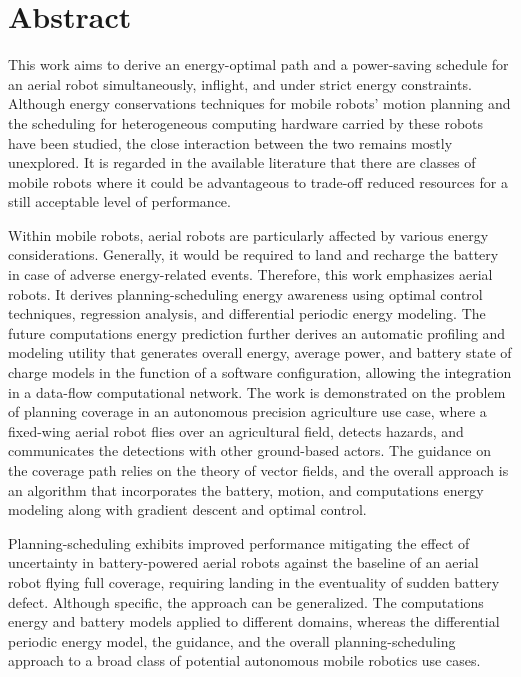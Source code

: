 
%
%
\chapter*{Abstract}

This work aims to derive an energy-optimal path and a power-saving schedule for an aerial robot simultaneously, inflight, and under strict energy constraints. Although energy conservations techniques for mobile robots' motion planning and the scheduling for heterogeneous computing hardware carried by these robots have been studied, the close interaction between the two remains mostly unexplored. It is regarded in the available literature that there are classes of mobile robots where it could be advantageous to trade-off reduced resources for a still acceptable level of performance. 

Within mobile robots, aerial robots are particularly affected by various energy considerations. Generally, it would be required to land and recharge the battery in case of adverse energy-related events. Therefore, this work emphasizes aerial robots. It derives planning-scheduling energy awareness using optimal control techniques, regression analysis, and differential periodic energy modeling. The future computations energy prediction further derives an automatic profiling and modeling utility that generates overall energy, average power, and battery state of charge models in the function of a software configuration, allowing the integration in a data-flow computational network. The work is demonstrated on the problem of planning coverage in an autonomous precision agriculture use case, where a fixed-wing aerial robot flies over an agricultural field, detects hazards, and communicates the detections with other ground-based actors. The guidance on the coverage path relies on the theory of vector fields, and the overall approach is an algorithm that incorporates the battery, motion, and computations energy modeling along with gradient descent and optimal control. 

Planning-scheduling exhibits improved performance mitigating the effect of uncertainty in battery-powered aerial robots against the baseline of an aerial robot flying full coverage, requiring landing in the eventuality of sudden battery defect. Although specific, the approach can be generalized. The computations energy and battery models applied to different domains, whereas the differential periodic energy model, the guidance, and the overall planning-scheduling approach to a broad class of potential autonomous mobile robotics use cases.


\cleardoublepage   %

